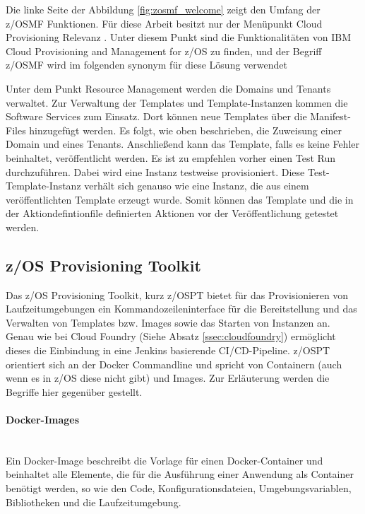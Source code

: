Die linke Seite der Abbildung \ref{fig:zosmf_welcome} zeigt den Umfang der z/OSMF  Funktionen.
Für diese Arbeit besitzt nur der Menüpunkt \glqq Cloud Provisioning\grqq{} Relevanz .
Unter diesem Punkt sind die Funktionalitäten von \glqq IBM Cloud Provisioning and Management for z/OS\grqq{} zu finden, und der Begriff  \glqq z/OSMF\grqq{} wird im folgenden synonym für diese Lösung verwendet
\cite{Rotthove.2018}

Unter dem Punkt \glqq Resource Management\grqq{} werden die \glqq Domains\grqq{} und \glqq Tenants\grqq{} verwaltet.
Zur Verwaltung der Templates und Template-Instanzen kommen die \glqq Software Services\grqq{} zum Einsatz.
Dort können neue Templates über die Manifest-Files hinzugefügt werden.
Es folgt, wie oben beschrieben, die Zuweisung einer \glqq Domain\grqq{} und eines \glqq Tenants\grqq{}.
Anschließend kann das Template, falls es keine Fehler beinhaltet, veröffentlicht werden.
Es ist zu empfehlen vorher einen \glqq Test Run\grqq{} durchzuführen.
Dabei wird eine Instanz testweise provisioniert.
Diese Test-Template-Instanz verhält sich genauso wie eine Instanz, die aus einem veröffentlichten Template erzeugt wurde. 
Somit können das Template und die in der Aktiondefintionfile definierten Aktionen vor der Veröffentlichung getestet werden.
\cite{Rotthove.2018}


\subsection{z/OS Provisioning Toolkit}\label{sssec:zospt}
Das z/OS Provisioning Toolkit, kurz z/OSPT bietet für das Provisionieren von Laufzeitumgebungen ein Kommandozeileninterface für die Bereitstellung und das Verwalten von Templates bzw. \glqq Images\grqq{} sowie das Starten von Instanzen an.
Genau wie bei Cloud Foundry (Siehe Absatz \ref{ssec:cloudfoundry}) ermöglicht dieses die Einbindung in eine Jenkins basierende CI/CD-Pipeline.
z/OSPT orientiert sich an der Docker Commandline und spricht von Containern (auch wenn es in z/OS diese nicht gibt) und Images.
Zur Erläuterung werden die Begriffe hier  gegenüber gestellt.

\paragraph{\glqq Docker-Images\grqq}~\\
Ein Docker-Image beschreibt die Vorlage für einen Docker-Container und beinhaltet alle Elemente, die für die Ausführung einer Anwendung als Container benötigt werden, so wie den Code, Konfigurationsdateien, Umgebungsvariablen, Bibliotheken und die Laufzeitumgebung.

